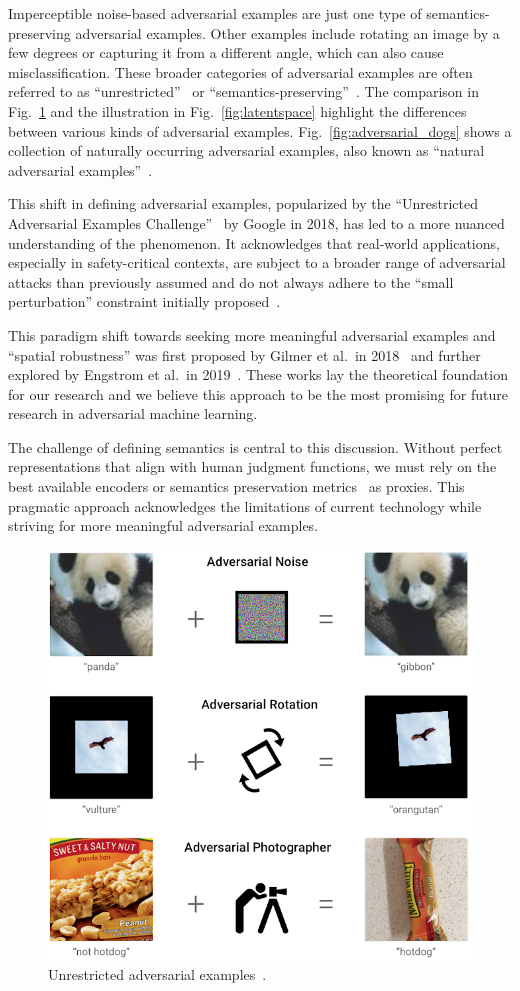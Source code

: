 \documentclass[a4paper, oneside]{discothesis}
\begin{document}
Imperceptible noise-based adversarial examples are just one type of semantics-preserving adversarial examples. Other examples include rotating an image by a few degrees or capturing it from a different angle, which can also cause misclassification. These broader categories of adversarial examples are often referred to as ``unrestricted''~\cite{fazlija2024real, brown2018unrestricted} or ``semantics-preserving''~\cite{browne2020semantics, careil2023towards, lee2020semantics}. The comparison in Fig.~\ref{fig:unrestricted} and the illustration in Fig.~\ref{fig:latentspace} highlight the differences between various kinds of adversarial examples. Fig.~\ref{fig:adversarial_dogs} shows a collection of naturally occurring adversarial examples, also known as ``natural adversarial examples''~\cite{hendrycks2021natural, teenybiscuittweet}.

This shift in defining adversarial examples, popularized by the ``Unrestricted Adversarial Examples Challenge''~\cite{brown2018unrestricted} by Google in 2018, has led to a more nuanced understanding of the phenomenon. It acknowledges that real-world applications, especially in safety-critical contexts, are subject to a broader range of adversarial attacks than previously assumed and do not always adhere to the ``small perturbation'' constraint initially proposed~\cite{brown2018unrestricted}.

This paradigm shift towards seeking more meaningful adversarial examples and ``spatial robustness'' was first proposed by Gilmer et al.\ in 2018~\cite{gilmer2018motivating} and further explored by Engstrom et al.\ in 2019~\cite{engstrom2019exploring}. These works lay the theoretical foundation for our research and we believe this approach to be the most promising for future research in adversarial machine learning.

The challenge of defining semantics is central to this discussion. Without perfect representations that align with human judgment functions, we must rely on the best available encoders or semantics preservation metrics~\cite{engstrom2019exploring, herel2023preserving} as proxies. This pragmatic approach acknowledges the limitations of current technology while striving for more meaningful adversarial examples.

\begin{figure}
	\centering
	\includegraphics[width=0.45\columnwidth]{figures/unrestricted-advx.png}
	\caption{Unrestricted adversarial examples~\cite{brown2018unrestricted}.}
	\label{fig:unrestricted}
\end{figure}
\end{document}
